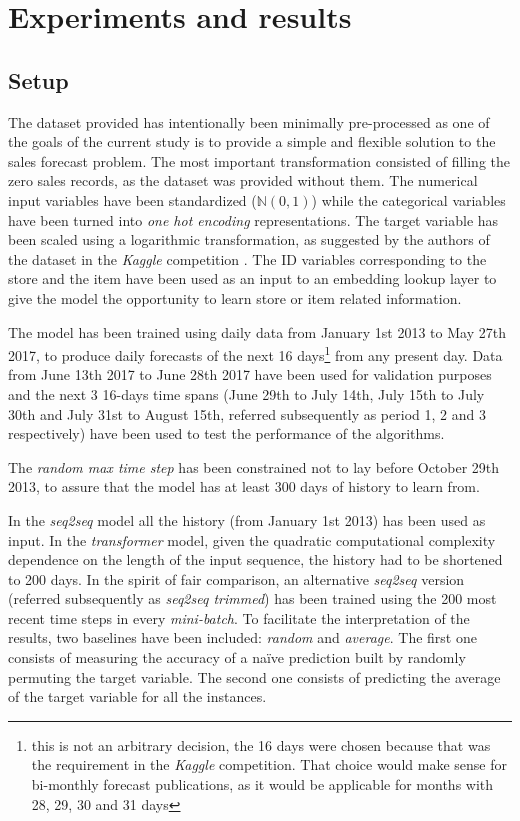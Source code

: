 \section{Experiments and results} \label{sec:salesforecast_results}
\subsection{Setup}
The dataset provided has intentionally been minimally pre-processed as one of the goals of the current study is to provide a simple and flexible solution to the sales forecast problem. The most important transformation consisted of filling the zero sales records, as the dataset was provided without them. The numerical input variables have been standardized ($\mathbb{N}(0,1)$) while the categorical variables have been turned into \textit{one hot encoding} representations. The target variable has been scaled using a logarithmic transformation, as suggested by the authors of the dataset in the \textit{Kaggle} competition \autocite{corporacionfavoritadataset2018}. The ID variables corresponding to the store and the item have been used as an input to an embedding lookup layer to give the model the opportunity to learn store or item related information.

The model has been trained using daily data from January 1st 2013 to May 27th 2017, to produce daily forecasts of the next 16 days\footnote{this is not an arbitrary decision, the 16 days were chosen because that was the requirement in the \textit{Kaggle} competition. That choice would make sense for bi-monthly forecast publications, as it would be applicable for months with 28, 29, 30 and 31 days} from any present day. Data from  June 13th 2017 to June 28th 2017 have been used for validation purposes and the next 3 16-days time spans (June 29th to July 14th, July 15th to July 30th and July 31st to August 15th, referred subsequently as period 1, 2 and 3 respectively) have been used to test the performance of the algorithms.

The \textit{random max time step} has been constrained not to lay before October 29th 2013, to assure that the model has at least 300 days of history to learn from.

In the \textit{seq2seq} model all the history (from January 1st 2013) has been used as input.  In the \textit{transformer} model, given the quadratic computational complexity dependence on the length of the input sequence, the history had to be shortened to 200 days. In the spirit of fair comparison, an alternative \textit{seq2seq} version (referred subsequently as \textit{seq2seq trimmed}) has been trained using the 200 most recent time steps in every \textit{mini-batch}. To facilitate the interpretation of the results, two baselines have been included: \textit{random} and \textit{average}. The first one consists of measuring the accuracy of a naïve prediction built by randomly permuting the target variable. The second one consists of predicting the average of the target variable for all the instances.

